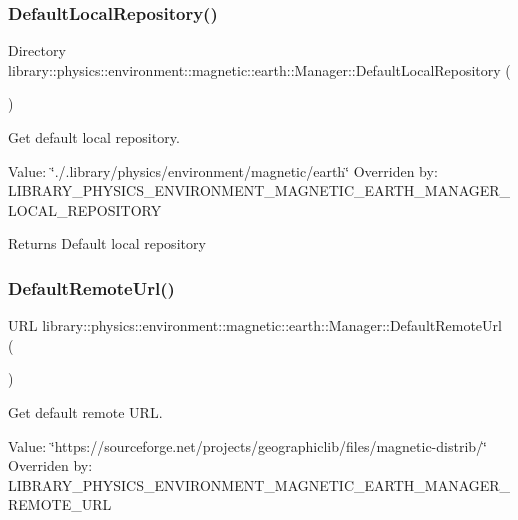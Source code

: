 \subsubsection{\texorpdfstring{Default\+Local\+Repository()}{DefaultLocalRepository()}}
{\footnotesize\ttfamily Directory library\+::physics\+::environment\+::magnetic\+::earth\+::\+Manager\+::\+Default\+Local\+Repository (\begin{DoxyParamCaption}{ }\end{DoxyParamCaption})\hspace{0.3cm}{\ttfamily [static]}}



Get default local repository. 

Value\+: \char`\"{}./.\+library/physics/environment/magnetic/earth\char`\"{} Overriden by\+: L\+I\+B\+R\+A\+R\+Y\+\_\+\+P\+H\+Y\+S\+I\+C\+S\+\_\+\+E\+N\+V\+I\+R\+O\+N\+M\+E\+N\+T\+\_\+\+M\+A\+G\+N\+E\+T\+I\+C\+\_\+\+E\+A\+R\+T\+H\+\_\+\+M\+A\+N\+A\+G\+E\+R\+\_\+\+L\+O\+C\+A\+L\+\_\+\+R\+E\+P\+O\+S\+I\+T\+O\+RY

\begin{DoxyReturn}{Returns}
Default local repository 
\end{DoxyReturn}
\mbox{\label{classlibrary_1_1physics_1_1environment_1_1magnetic_1_1earth_1_1_manager_af27590c795dd6b87166b84495b777d2f}} 
\subsubsection{\texorpdfstring{Default\+Remote\+Url()}{DefaultRemoteUrl()}}
{\footnotesize\ttfamily U\+RL library\+::physics\+::environment\+::magnetic\+::earth\+::\+Manager\+::\+Default\+Remote\+Url (\begin{DoxyParamCaption}{ }\end{DoxyParamCaption})\hspace{0.3cm}{\ttfamily [static]}}



Get default remote U\+RL. 

Value\+: \char`\"{}https\+://sourceforge.\+net/projects/geographiclib/files/magnetic-\/distrib/\char`\"{} Overriden by\+: L\+I\+B\+R\+A\+R\+Y\+\_\+\+P\+H\+Y\+S\+I\+C\+S\+\_\+\+E\+N\+V\+I\+R\+O\+N\+M\+E\+N\+T\+\_\+\+M\+A\+G\+N\+E\+T\+I\+C\+\_\+\+E\+A\+R\+T\+H\+\_\+\+M\+A\+N\+A\+G\+E\+R\+\_\+\+R\+E\+M\+O\+T\+E\+\_\+\+U\+RL


